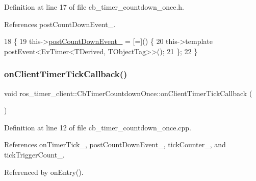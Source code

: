Definition at line 17 of file cb\+\_\+timer\+\_\+countdown\+\_\+once.\+h.



References post\+Count\+Down\+Event\+\_\+.


\begin{DoxyCode}
18     \{
19         this->\hyperlink{classros__timer__client_1_1CbTimerCountdownOnce_a57712ed15f37200e03a15d0c2e3d05fd}{postCountDownEvent\_} = [=]() \{
20             this->\textcolor{keyword}{template} postEvent<EvTimer<TDerived, TObjectTag>>();
21         \};
22     \}
\end{DoxyCode}
\mbox{\label{classros__timer__client_1_1CbTimerCountdownOnce_afe103d54afa6b6e7b89fc65447b69523}} 
\subsubsection{\texorpdfstring{on\+Client\+Timer\+Tick\+Callback()}{onClientTimerTickCallback()}}
{\footnotesize\ttfamily void ros\+\_\+timer\+\_\+client\+::\+Cb\+Timer\+Countdown\+Once\+::on\+Client\+Timer\+Tick\+Callback (\begin{DoxyParamCaption}{ }\end{DoxyParamCaption})\hspace{0.3cm}{\ttfamily [private]}}



Definition at line 12 of file cb\+\_\+timer\+\_\+countdown\+\_\+once.\+cpp.



References on\+Timer\+Tick\+\_\+, post\+Count\+Down\+Event\+\_\+, tick\+Counter\+\_\+, and tick\+Trigger\+Count\+\_\+.



Referenced by on\+Entry().


